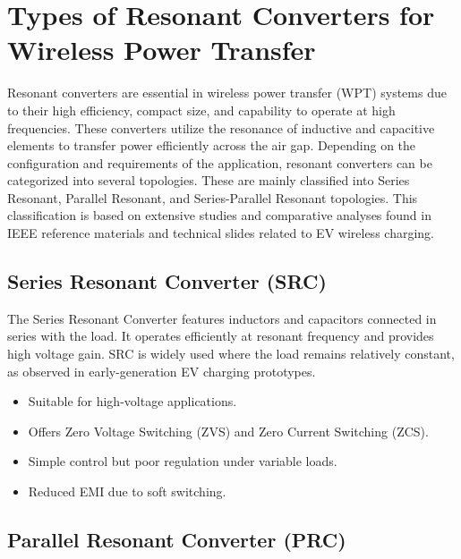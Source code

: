 \documentclass[12pt,a4paper]{report}
\begin{document}

\chapter{Types of Resonant Converters for Wireless Power Transfer}
\vspace{1cm}
\quad Resonant converters are essential in wireless power transfer (WPT) systems due to their high efficiency, compact size, and capability to operate at high frequencies. These converters utilize the resonance of inductive and capacitive elements to transfer power efficiently across the air gap. Depending on the configuration and requirements of the application, resonant converters can be categorized into several topologies. These are mainly classified into Series Resonant, Parallel Resonant, and Series-Parallel Resonant topologies. This classification is based on extensive studies and comparative analyses found in IEEE reference materials and technical slides related to EV wireless charging.

\section{Series Resonant Converter (SRC)}

\quad The Series Resonant Converter features inductors and capacitors connected in series with the load. It operates efficiently at resonant frequency and provides high voltage gain. SRC is widely used where the load remains relatively constant, as observed in early-generation EV charging prototypes.\cite{li2022singleended}\cite{erickson2020resonant}

\begin{itemize}
    \item Suitable for high-voltage applications.
    \item Offers Zero Voltage Switching (ZVS) and Zero Current Switching (ZCS).
    \item Simple control but poor regulation under variable loads.
    \item Reduced EMI due to soft switching.
\end{itemize}

\section{Parallel Resonant Converter (PRC)}
\end{document}
